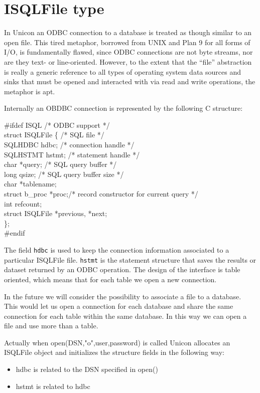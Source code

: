 \section{ISQLFile type}

In Unicon an ODBC connection to a database is treated as though similar
to an open file.  This tired metaphor, borrowed from UNIX and Plan 9 for
all forms of I/O, is fundamentally flawed, since ODBC connections are not
byte streams, nor are they text- or line-oriented. However, to the extent
that the ``file'' abstraction is really a generic reference to all types
of operating system data sources and sinks that must be opened and
interacted with via read and write operations, the metaphor is apt.

Internally an OBDBC connection is represented by the following C
structure:

\begin{iconcode}
\#ifdef ISQL\>\>\>\>\>\>\>\>\>\>             /* ODBC support */ \\
\>  struct ISQLFile \{\>\>\>\>\>\>\>\>\>     /* SQL file     */ \\
\>\>    SQLHDBC hdbc;\>\>\>\>\>\>\>\>        /* connection handle */ \\
\>\>    SQLHSTMT hstmt;\>\>\>\>\>\>\>\>      /* statement handle  */ \\
\>\>    char *query;\>\>\>\>\>\>\>\>         /* SQL query buffer */ \\
\>\>    long qsize;\>\>\>\>\>\>\>\>          /* SQL query buffer size */ \\
\>\>    char *tablename; \\
\>\>    struct b\_proc *proc;\>\>\>\>\>\>\>\>/* record constructor for current query */ \\
\>\>    int refcount; \\
\>\>    struct ISQLFile *previous, *next; \\
\>\>    \}; \\
\#endif
\end{iconcode}

The field \texttt{hdbc} is used to keep the connection information associated
to a particular ISQLFile file. \texttt{hstmt} is the statement structure that
saves the results or dataset returned by an ODBC operation. The design
of the interface is table oriented, which means that for each table we
open a new connection.

In the future we will consider the possibility to associate a file to
a database. This would let us open a connection for each database and
share the same connection for each table within the same database. In
this way we can open a file and use more than a table.

Actually when open(DSN,"o",user,password) is called Unicon allocates
an ISQLFile object and initializes the structure fields in the
following way:

\begin{itemize}
\item    hdbc is related to the DSN specified in open()
\item    hstmt is related to hdbc
\end{itemize}
